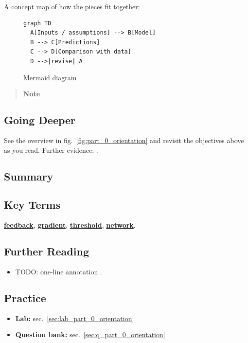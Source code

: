 \documentclass[
]{article}
\providecommand{\tightlist}{%
  \setlength{\itemsep}{0pt}\setlength{\parskip}{0pt}}
\theoremstyle{plain}
\theoremstyle{definition}
\begin{document}
A concept map of how the pieces fit together:

\begin{figure}[htbp]
\centering
\begin{verbatim}
graph TD
  A[Inputs / assumptions] --> B[Model]
  B --> C[Predictions]
  C --> D[Comparison with data]
  D -->|revise| A
\end{verbatim}
\caption{Mermaid diagram}
\end{figure}

\begin{quote}
\textbf{Note}
\end{quote}

\subsection{Going Deeper}\label{going-deeper}

See the overview in fig.~\ref{fig:part_0_orientation} and revisit the
objectives above as you read. Further evidence:
\citep{kim2020data, brown2017principles}.

\subsection{Summary}\label{summary}

\subsection{Key Terms}\label{key-terms}

\hyperref[gl:feedback]{\textbf{feedback}},
\hyperref[gl:gradient]{\textbf{gradient}},
\hyperref[gl:threshold]{\textbf{threshold}},
\hyperref[gl:network]{\textbf{network}}.

\subsection{Further Reading}\label{further-reading}

\begin{itemize}
\item
  TODO: one-line annotation \citep{wilson2021analysis}.
\end{itemize}

\subsection{Practice}\label{practice}

\begin{itemize}
\tightlist
\item
  \textbf{Lab:} sec.~\ref{sec:lab_part_0_orientation}
\item
  \textbf{Question bank:} sec.~\ref{sec:q_part_0_orientation}
\end{itemize}
\end{document}
